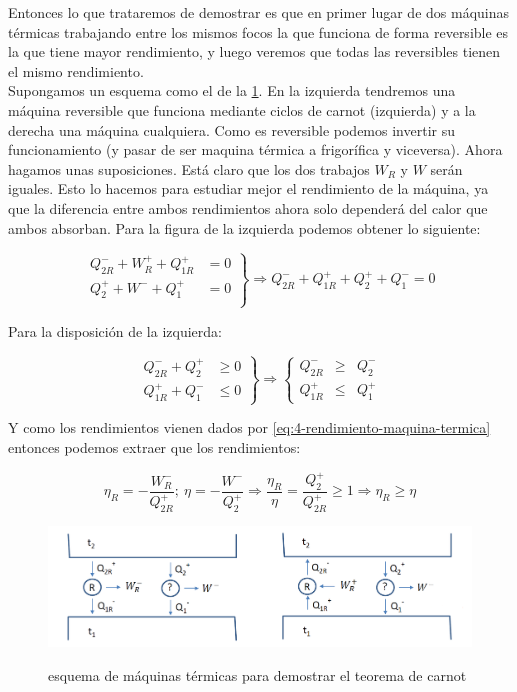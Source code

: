\documentclass[12pt,a4paper]{article}
\begin{document}
Entonces lo que trataremos de demostrar es que en primer lugar de dos máquinas térmicas trabajando entre los mismos focos la que funciona de forma reversible es la que tiene mayor rendimiento, y luego veremos que todas las reversibles tienen el mismo rendimiento. \\

Supongamos un esquema como el de la \ref{fig:4-teorema-carnot}. En la izquierda tendremos una máquina reversible que funciona mediante ciclos de carnot (izquierda) y a la derecha una máquina cualquiera. Como es reversible podemos invertir su funcionamiento (y pasar de ser maquina térmica a frigorífica y viceversa). Ahora hagamos unas suposiciones. Está claro que los dos trabajos $W_R$ y $W$ serán iguales. Esto lo hacemos para estudiar mejor el rendimiento de la máquina, ya que la diferencia entre ambos rendimientos ahora solo dependerá del calor que ambos absorban. Para la figura de la izquierda podemos obtener lo siguiente:


\begin{equation}
\left. \begin{array}{ll}
Q_{2R}^- + W_R^+ + Q_{1R}^+ & = 0\\
Q_2^+ + W^- + Q_1^+ & = 0\\
\end{array} \right\rbrace \Longrightarrow Q_{2R}^-+Q_{1R}^++Q_2^++Q_1^- = 0
\end{equation}

Para la disposición de la izquierda:

\begin{displaymath}
\left. \begin{array}{ll}
Q_{2R}^- + Q_2^+ & \geq 0 \\
Q_{1R}^+ + Q_1^-  & \leq 0
\end{array} \right\rbrace \Longrightarrow 
\left\lbrace \begin{array}{lll}
Q_{2R}^- & \geq & Q_2^- \\
Q_{1R}^+ & \leq & Q_1^+ 
\end{array} \right.
\end{displaymath}

Y como los rendimientos vienen dados por \ref{eq:4-rendimiento-maquina-termica} entonces podemos extraer que los rendimientos:

$$ \eta_R = - \dfrac{W_R^-}{Q_{2R}^+}; \ \eta= -\dfrac{W^-}{Q_{2}^+} \Longrightarrow \dfrac{\eta_R}{\eta} = \dfrac{Q_2^+}{Q_{2R}^+} \geq 1 \Longrightarrow \eta_R \geq \eta  $$


\begin{figure}[h!] \centering
\includegraphics[scale=0.6]{Teorema-carnot.png}
\label{fig:4-teorema-carnot}
\caption{esquema de máquinas térmicas para demostrar el teorema de carnot}
\end{figure}
\end{document}
